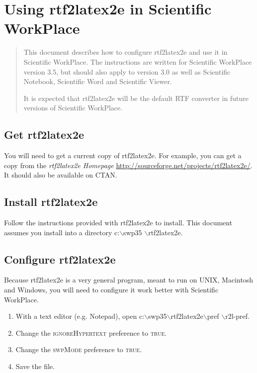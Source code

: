\documentclass{article}
\newcommand{\TEXTsymbol}[1]{$#1$}
\begin{document}
\section{Using rtf2latex2e in Scientific WorkPlace}

\begin{quotation}
This document describes how to configure rtf2latex2e and use it in
Scientific WorkPlace. The instructions are written for Scientific WorkPlace
version 3.5, but should also apply to version 3.0 as well as Scientific
Notebook, Scientific Word and Scientific Viewer.

It is expected that rtf2latex2e will be the default RTF converter in future
versions of Scientific WorkPlace.
\end{quotation}

\subsection{Get rtf2latex2e}

You will need to get a current copy of rtf2latex2e. For example, you can get
a copy from the \textit{rtf2latex2e Homepage} \hyperref{%
http://sourceforge.net/projects/rtf2latex2e/}{}{}{%
http://sourceforge.net/projects/rtf2latex2e/}. It should also be available on
CTAN.

\subsection{Install rtf2latex2e}

Follow the instructions provided with rtf2latex2e to install. This document
assumes you install into a directory \textsf{c:\TEXTsymbol{\backslash}swp35%
\TEXTsymbol{\backslash}rtf2latex2e}.

\subsection{Configure rtf2latex2e}

Because rtf2latex2e is a very general program, meant to run on UNIX,
Macintosh and Windows, you will need to configure it work better with
Scientific WorkPlace.

\begin{enumerate}
\item With a text editor (e.g. Notepad), open \textsf{c:\TEXTsymbol{%
\backslash}swp35\TEXTsymbol{\backslash}rtf2latex2e\TEXTsymbol{\backslash}pref%
\TEXTsymbol{\backslash}r2l-pref}.

\item Change the \textsc{ignoreHypertext} preference to \textsc{true}.

\item Change the \textsc{swpMode} preference to \textsc{true}.

\item Save the file.
\end{enumerate}
\end{document}
